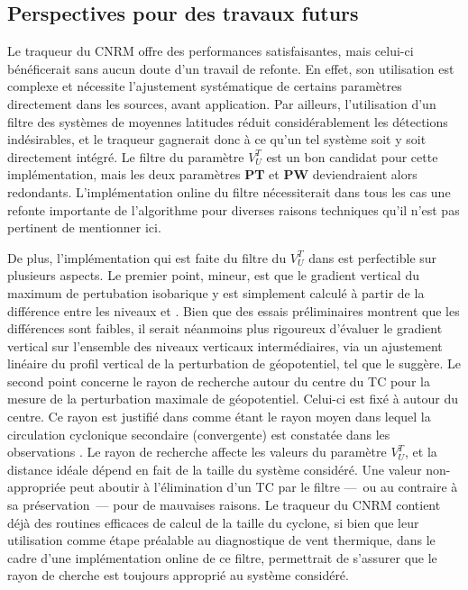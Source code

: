 \documentclass[../main.tex]{subfiles}
\begin{document}
\subsection*{Perspectives pour des travaux futurs}

Le traqueur du CNRM offre des performances satisfaisantes, mais celui-ci bénéficerait sans aucun doute d'un travail de refonte. En effet, son utilisation est
complexe et nécessite l'ajustement systématique de certains paramètres directement dans les sources, avant application. Par ailleurs, l'utilisation d'un filtre
des systèmes de moyennes latitudes réduit considérablement les détections indésirables, et le traqueur gagnerait donc à ce qu'un tel système soit y soit
directement intégré. Le filtre du paramètre $V_U^T$ est un bon candidat pour cette implémentation, mais les deux paramètres \textbf{PT} et \textbf{PW}
deviendraient alors redondants. L'implémentation online du filtre nécessiterait dans tous les cas une refonte importante de l'algorithme pour diverses raisons
techniques qu'il n'est pas pertinent de mentionner ici.

De plus, l'implémentation qui est faite du filtre du $V_U^T$ dans \textcite{dulac_assessing_2023} est perfectible sur plusieurs aspects. Le premier point,
mineur, est que le gradient vertical du maximum de pertubation isobarique y est simplement calculé à partir de la différence entre les niveaux  et
. Bien que des essais préliminaires montrent que les différences sont faibles, il serait néanmoins plus rigoureux d'évaluer le gradient vertical sur
l'ensemble des niveaux verticaux intermédiaires, via un ajustement linéaire du profil vertical de la perturbation de géopotentiel, tel que
\textcite{hart_cyclone_2003} le suggère. Le second point concerne le rayon de recherche autour du centre du TC pour la mesure de la perturbation maximale de
géopotentiel. Celui-ci est fixé à  autour du centre. Ce rayon est justifié dans \textcite{hart_cyclone_2003} comme étant le rayon moyen dans lequel la
circulation cyclonique secondaire (convergente) est constatée dans les observations \parencite{frank_structure_1977}. Le rayon de recherche affecte les valeurs
du paramètre $V_U^T$, et la distance idéale dépend en fait de la taille du système considéré. Une valeur non-appropriée peut aboutir à l'élimination d'un TC par
le filtre ---~ou au contraire à sa préservation~--- pour de mauvaises raisons. Le traqueur du CNRM contient déjà des routines efficaces de calcul de la taille
du cyclone, si bien que leur utilisation comme étape préalable au diagnostique de vent thermique, dans le cadre d'une implémentation online de ce filtre,
permettrait de s'assurer que le rayon de cherche est toujours approprié au système considéré.
\end{document}
